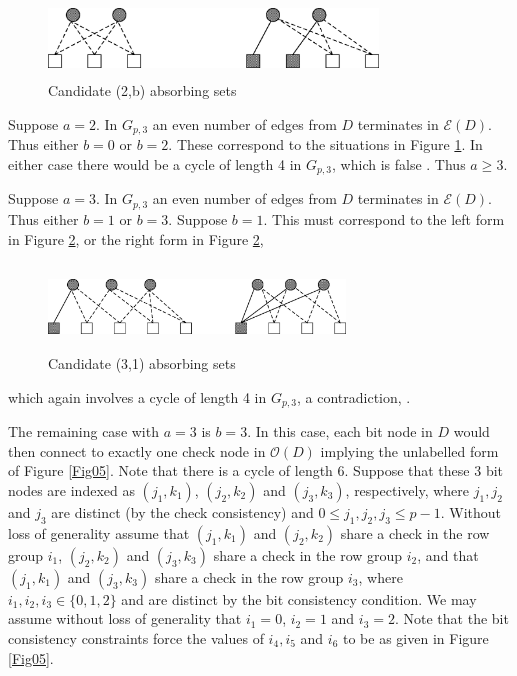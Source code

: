 \begin{figure}
\center\includegraphics[width=3.45in,height=0.8in]{fig07.eps}
\caption{Candidate (2,b) absorbing sets}\label{Fig07}
\end{figure}
Suppose $a=2$. In $G_{p,3}$ an even number of edges from $D$
terminates in $\mathcal{E}(D)$. Thus either $b=0$ or $b=2$. These
correspond to the situations in Figure \ref{Fig07}. In either case
there would be a cycle of length 4 in $G_{p,3}$, which is false
\cite{fan}. Thus $a\geq 3$.

Suppose $a=3$. In $G_{p,3}$ an even number of edges from $D$
terminates in $\mathcal{E}(D)$. Thus either $b=1$ or $b=3$. Suppose
$b=1$. This must correspond to the left form in Figure \ref{Fig06},
or the right form in Figure \ref{Fig06},
\begin{figure}
\center\includegraphics[width=3.1in,height=0.9in]{Visio-fig05z.eps}%
\caption{Candidate (3,1) absorbing sets}\label{Fig06}
\end{figure}
which again involves a cycle of length 4 in $G_{p,3}$, a
contradiction, \cite{fan}.

The remaining case with $a=3$ is $b=3$. In this case, each bit node
in $D$ would then connect to exactly one check node in
$\mathcal{O}(D)$ implying the unlabelled form of Figure \ref{Fig05}.
Note that there is a cycle of length 6. Suppose that these $3$ bit
nodes are indexed as $(j_1,k_1)$, $(j_2,k_2)$ and $(j_3,k_3)$,
respectively, where $j_1,j_2$ and $j_3$ are distinct (by the check
consistency) and $0 \leq j_1, j_2, j_3 \leq p-1$. Without loss of
generality assume that $(j_1,k_1)$ and $(j_2,k_2)$ share a check in
the row group $i_1$, $(j_2,k_2)$ and $(j_3,k_3)$ share a check in
the row group $i_2$, and that $(j_1,k_1)$ and $(j_3,k_3)$ share a
check in the row group $i_3$, where $i_1,i_2,i_3 \in \{0,1,2\}$ and
are distinct by the bit consistency condition. We may assume without
loss of generality that $i_1=0$, $i_2=1$ and $i_3=2$. Note that the
bit consistency constraints force the values of $i_4,i_5$ and $i_6$
to be as given in Figure \ref{Fig05}.

